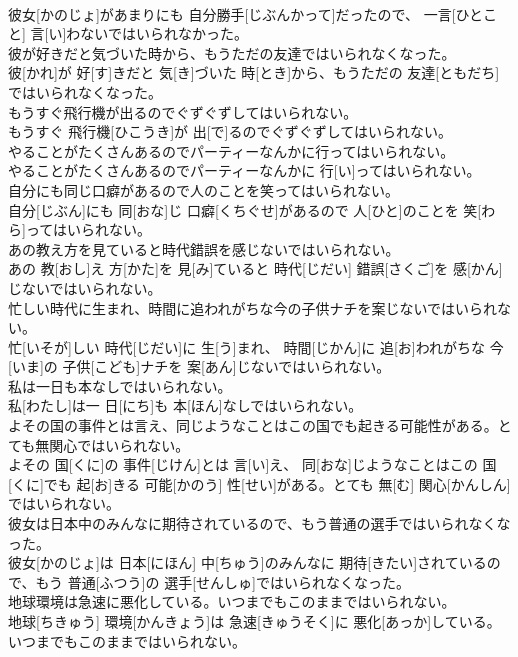 \documentclass[8pt]{extreport}
\begin{document}
\begin{CJK}{UTF8}{min}
\\	彼女[かのじょ]があまりにも 自分勝手[じぶんかって]だったので、 一言[ひとこと] 言[い]わないではいられなかった。
\\	彼が好きだと気づいた時から、もうただの友達ではいられなくなった。	
\\	彼[かれ]が 好[す]きだと 気[き]づいた 時[とき]から、もうただの 友達[ともだち]ではいられなくなった。
\\	もうすぐ飛行機が出るのでぐずぐずしてはいられない。	
\\	もうすぐ 飛行機[ひこうき]が 出[で]るのでぐずぐずしてはいられない。
\\	やることがたくさんあるのでパーティーなんかに行ってはいられない。	
\\	やることがたくさんあるのでパーティーなんかに 行[い]ってはいられない。
\\	自分にも同じ口癖があるので人のことを笑ってはいられない。	
\\	自分[じぶん]にも 同[おな]じ 口癖[くちぐせ]があるので 人[ひと]のことを 笑[わら]ってはいられない。
\\	あの教え方を見ていると時代錯誤を感じないではいられない。	
\\	あの 教[おし]え 方[かた]を 見[み]ていると 時代[じだい] 錯誤[さくご]を 感[かん]じないではいられない。
\\	忙しい時代に生まれ、時間に追われがちな今の子供ナチを案じないではいられない。	
\\	忙[いそが]しい 時代[じだい]に 生[う]まれ、 時間[じかん]に 追[お]われがちな 今[いま]の 子供[こども]ナチを 案[あん]じないではいられない。
\\	私は一日も本なしではいられない。	
\\	私[わたし]は一 日[にち]も 本[ほん]なしではいられない。
\\	よその国の事件とは言え、同じようなことはこの国でも起きる可能性がある。とても無関心ではいられない。	
\\	よその 国[くに]の 事件[じけん]とは 言[い]え、 同[おな]じようなことはこの 国[くに]でも 起[お]きる 可能[かのう] 性[せい]がある。とても 無[む] 関心[かんしん]ではいられない。
\\	彼女は日本中のみんなに期待されているので、もう普通の選手ではいられなくなった。	
\\	彼女[かのじょ]は 日本[にほん] 中[ちゅう]のみんなに 期待[きたい]されているので、もう 普通[ふつう]の 選手[せんしゅ]ではいられなくなった。
\\	地球環境は急速に悪化している。いつまでもこのままではいられない。	
\\	地球[ちきゅう] 環境[かんきょう]は 急速[きゅうそく]に 悪化[あっか]している。いつまでもこのままではいられない。

\end{CJK}
\end{document}
